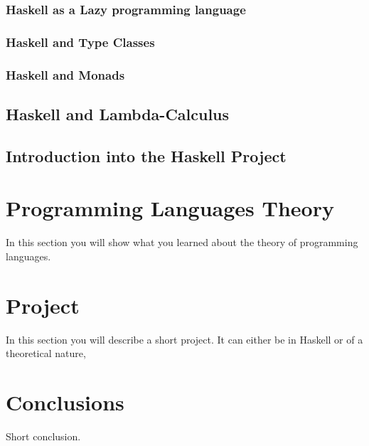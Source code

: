 \documentclass{article}
\begin{document}
\subsubsection{Haskell as a Lazy programming language}
\subsubsection{Haskell and Type Classes}
\subsubsection{Haskell and Monads}

\subsection{Haskell and Lambda-Calculus}
\subsection{Introduction into the Haskell Project}



\section{Programming Languages Theory}

In this section you will show what you learned about the theory of programming languages. 

\section{Project}

In this section you will describe a short project. It can either be in Haskell or of a theoretical nature,

\section{Conclusions}\label{conclusions}
Short conclusion. 
\end{document}
